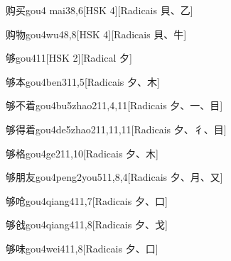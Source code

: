 \begin{entry}{购买}{gou4 mai3}{8,6}[HSK 4][Radicais ⾙、⼄]
\end{entry}

\begin{entry}{购物}{gou4wu4}{8,8}[HSK 4][Radicais ⾙、⽜]
\end{entry}

\begin{entry}{够}{gou4}{11}[HSK 2][Radical ⼣]
\end{entry}

\begin{entry}{够本}{gou4ben3}{11,5}[Radicais ⼣、⽊]
\end{entry}

\begin{entry}{够不着}{gou4bu5zhao2}{11,4,11}[Radicais ⼣、⼀、⽬]
\end{entry}

\begin{entry}{够得着}{gou4de5zhao2}{11,11,11}[Radicais ⼣、⼻、⽬]
\end{entry}

\begin{entry}{够格}{gou4ge2}{11,10}[Radicais ⼣、⽊]
\end{entry}

\begin{entry}{够朋友}{gou4peng2you5}{11,8,4}[Radicais ⼣、⽉、⼜]
\end{entry}

\begin{entry}{够呛}{gou4qiang4}{11,7}[Radicais ⼣、⼝]
\end{entry}

\begin{entry}{够戗}{gou4qiang4}{11,8}[Radicais ⼣、⼽]
\end{entry}

\begin{entry}{够味}{gou4wei4}{11,8}[Radicais ⼣、⼝]
\end{entry}

